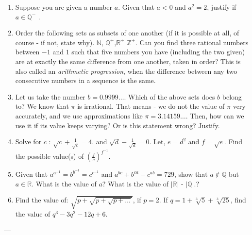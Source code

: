 \documentclass[8pt,a4paper]{extarticle}
\begin{document}
\begin{enumerate}
\item Suppose you are given a number $a$. Given that $a<0$ and $a^2 = 2$, justify if $a \in \mathbb{Q^-}$ .
\item Order the following sets as subsets of one another (if it is possible at all, of course - if not, state why). $\mathbb{N}$, $\mathbb{Q^+}$,$\mathbb{R^+}$ $\mathbb{Z^+}$. Can you find three rational numbers between $-1$ and $1$ such that five numbers you have (including the two given) are at exactly the same difference from one another, taken in order? This is also called an \textit{arithmetic progression}, when the difference between any two consecutive numbers in a sequence is the same.
\item Let us take the number $b = 0.9999 \ldots$. Which of the above sets does $b$ belong to? We know that $\pi$ is irrational. That means - we do not the value of $\pi$ very accurately, and we use approximations like $\pi = 3.14159\ldots$. Then, how can we use it if its value keeps varying? Or is this statement wrong? Justify.
\item Solve for $c$ : $\sqrt{c} + \frac{1}{\sqrt{c}} = 4. $ and  $\sqrt{d} - \frac{1}{\sqrt{d}} = 0. $ Let, $e=d^2$ and $f=\sqrt{e}$. Find the possible value(s) of ${ \left( \frac{f}{c} \right)}^{f^{-1}}$.
\item Given that $a^{a^{-1}} = b^{b^{-1}} = c^{c^{-1}}$ and $a^{bc} + b^{ca} + c^{ab} = 729$, show that $a \notin \mathbb{Q}$ but $a \in \mathbb{R}$. What is the value of $a$? What is the value of  $\left\vert{\mathbb{R}}\right\vert$ - $\left\vert{\mathbb{Q}}\right\vert$.?
\item Find the value of: $\sqrt{p + \sqrt{p + \sqrt{p + \ldots}}}$, if $p = 2$. If $q = 1 + \sqrt[3]{5} + \sqrt[3]{25}$, find the value of $q^3 - 3q^2 - 12q + 6$.
\end{enumerate}

\begin{center}\textsc{---}\end{center}
\end{document}
